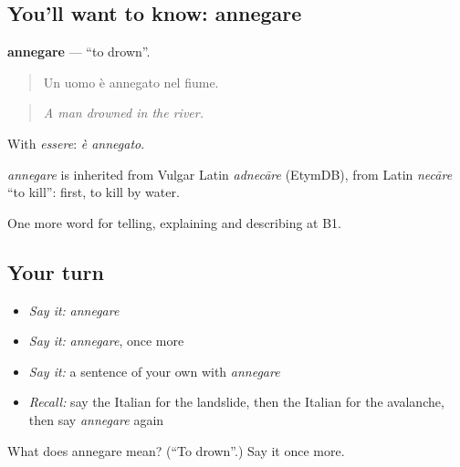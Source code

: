 \subsection*{You'll want to know: annegare}
\textbf{annegare} — \textquotedblleft{}to drown\textquotedblright{}.

\begin{quote}
Un uomo è annegato nel fiume.
\end{quote}

\begin{quote}
\emph{A man drowned in the river.}
\end{quote}

With \emph{essere}: \emph{è annegato}.

\begin{cousinweb}
\emph{annegare} is inherited from Vulgar Latin \emph{adnecāre} (EtymDB), from Latin \emph{necāre} \textquotedblleft{}to kill\textquotedblright{}: first, to kill by water.
\end{cousinweb}

\begin{grammarlens}[title={What you've built}]
One more word for telling, explaining and describing at B1.
\end{grammarlens}

\subsection*{Your turn}
\begin{itemize}
\raggedright
  \item \emph{Say it:} \emph{annegare}
  \item \emph{Say it:} \emph{annegare}, once more
  \item \emph{Say it:} a sentence of your own with \emph{annegare}
  \item \emph{Recall:} say the Italian for the landslide, then the Italian for the avalanche, then say \emph{annegare} again
\end{itemize}

\begin{tcolorbox}[breakable,colback=teal!4,colframe=teal!35!black,title={Before you move on}]
What does annegare mean? (\textquotedblleft{}To drown\textquotedblright{}.) Say it once more.
\end{tcolorbox}
